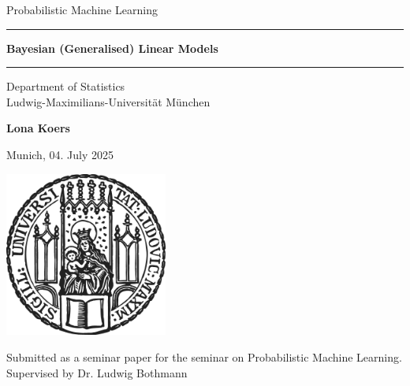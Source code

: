 \documentclass[12pt]{article}
\newcommand{\mytitle}{Bayesian (Generalised) Linear Models}
\newcommand{\myname}{Lona Koers}
\newcommand{\mysupervisor}{Dr. Ludwig Bothmann}
\begin{document}

\begin{titlepage}
\begin{center}

\LARGE
Probabilistic Machine Learning

\vspace{0.5cm}

\rule{\textwidth}{1.5pt}
\LARGE
\textbf{\mytitle}
\rule{\textwidth}{1.5pt}

\vspace{0.5cm}

\large
Department of Statistics \\
Ludwig-Maximilians-Universität München

\vfill

\Large
\textbf{\myname}

\vfill

\large
Munich, 04. July 2025

\vfill

\includegraphics[width = 0.4\textwidth]{sigillum.png}

\vfill

\normalsize
Submitted as a seminar paper for the seminar on Probabilistic Machine Learning.
\\

Supervised by \mysupervisor

\end{center}
\end{titlepage}


\newpage
\end{document}
